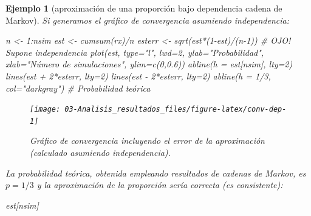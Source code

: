 \documentclass[
]{book}
\newenvironment{Shaded}{\begin{snugshade}}{\end{snugshade}}
\newcommand{\AttributeTok}[1]{\textcolor[rgb]{0.77,0.63,0.00}{#1}}
\newcommand{\CommentTok}[1]{\textcolor[rgb]{0.56,0.35,0.01}{\textit{#1}}}
\newcommand{\DecValTok}[1]{\textcolor[rgb]{0.00,0.00,0.81}{#1}}
\newcommand{\FloatTok}[1]{\textcolor[rgb]{0.00,0.00,0.81}{#1}}
\newcommand{\FunctionTok}[1]{\textcolor[rgb]{0.00,0.00,0.00}{#1}}
\newcommand{\NormalTok}[1]{#1}
\newcommand{\OtherTok}[1]{\textcolor[rgb]{0.56,0.35,0.01}{#1}}
\newcommand{\SpecialCharTok}[1]{\textcolor[rgb]{0.00,0.00,0.00}{#1}}
\newcommand{\StringTok}[1]{\textcolor[rgb]{0.31,0.60,0.02}{#1}}
\theoremstyle{break}
\newtheorem{example}{Ejemplo}[chapter]
\theoremstyle{nonumberplain}
\begin{document}
\begin{example}[aproximación de una proporción bajo dependencia cadena de Markov]
Si generamos el gráfico de convergencia asumiendo independencia:

\begin{Shaded}
\begin{Highlighting}[]
\NormalTok{n }\OtherTok{\textless{}{-}} \DecValTok{1}\SpecialCharTok{:}\NormalTok{nsim}
\NormalTok{est }\OtherTok{\textless{}{-}} \FunctionTok{cumsum}\NormalTok{(rx)}\SpecialCharTok{/}\NormalTok{n}
\NormalTok{esterr }\OtherTok{\textless{}{-}} \FunctionTok{sqrt}\NormalTok{(est}\SpecialCharTok{*}\NormalTok{(}\DecValTok{1}\SpecialCharTok{{-}}\NormalTok{est)}\SpecialCharTok{/}\NormalTok{(n}\DecValTok{{-}1}\NormalTok{)) }\CommentTok{\# OJO! Supone independencia}
\FunctionTok{plot}\NormalTok{(est, }\AttributeTok{type=}\StringTok{"l"}\NormalTok{, }\AttributeTok{lwd=}\DecValTok{2}\NormalTok{, }\AttributeTok{ylab=}\StringTok{"Probabilidad"}\NormalTok{, }
     \AttributeTok{xlab=}\StringTok{"Número de simulaciones"}\NormalTok{, }\AttributeTok{ylim=}\FunctionTok{c}\NormalTok{(}\DecValTok{0}\NormalTok{,}\FloatTok{0.6}\NormalTok{))}
\FunctionTok{abline}\NormalTok{(}\AttributeTok{h =}\NormalTok{ est[nsim], }\AttributeTok{lty=}\DecValTok{2}\NormalTok{)}
\FunctionTok{lines}\NormalTok{(est }\SpecialCharTok{+} \DecValTok{2}\SpecialCharTok{*}\NormalTok{esterr, }\AttributeTok{lty=}\DecValTok{2}\NormalTok{) }
\FunctionTok{lines}\NormalTok{(est }\SpecialCharTok{{-}} \DecValTok{2}\SpecialCharTok{*}\NormalTok{esterr, }\AttributeTok{lty=}\DecValTok{2}\NormalTok{)}
\FunctionTok{abline}\NormalTok{(}\AttributeTok{h =} \DecValTok{1}\SpecialCharTok{/}\DecValTok{3}\NormalTok{, }\AttributeTok{col=}\StringTok{"darkgray"}\NormalTok{) }\CommentTok{\# Probabilidad teórica}
\end{Highlighting}
\end{Shaded}

\begin{figure}[!htb]

{\centering \texttt{[image: 03-Analisis\_resultados\_files/figure-latex/conv-dep-1]} 

}

\caption{Gráfico de convergencia incluyendo el error de la aproximación (calculado asumiendo independencia).}\label{fig:conv-dep}
\end{figure}

La probabilidad teórica, obtenida empleando resultados de cadenas de Markov, es \(p = 1/3\) y la aproximación de la proporción sería correcta (es consistente):

\begin{Shaded}
\begin{Highlighting}[]
\NormalTok{est[nsim]}
\end{Highlighting}
\end{Shaded}


\end{example}
\end{document}
